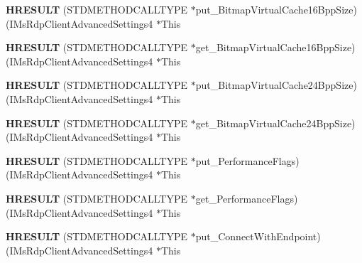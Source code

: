 \begin{DoxyCompactItemize}
{\bfseries H\+R\+E\+S\+U\+LT} (S\+T\+D\+M\+E\+T\+H\+O\+D\+C\+A\+L\+L\+T\+Y\+PE $\ast$put\+\_\+\+Bitmap\+Virtual\+Cache16\+Bpp\+Size)(I\+Ms\+Rdp\+Client\+Advanced\+Settings4 $\ast$This
\item 
\mbox{\label{struct_i_ms_rdp_client_advanced_settings4_vtbl_a248de40f77828d96f6df00f020040313}} 
{\bfseries H\+R\+E\+S\+U\+LT} (S\+T\+D\+M\+E\+T\+H\+O\+D\+C\+A\+L\+L\+T\+Y\+PE $\ast$get\+\_\+\+Bitmap\+Virtual\+Cache16\+Bpp\+Size)(I\+Ms\+Rdp\+Client\+Advanced\+Settings4 $\ast$This
\item 
\mbox{\label{struct_i_ms_rdp_client_advanced_settings4_vtbl_af2b827f8f98aefa5a0336550778a308c}} 
{\bfseries H\+R\+E\+S\+U\+LT} (S\+T\+D\+M\+E\+T\+H\+O\+D\+C\+A\+L\+L\+T\+Y\+PE $\ast$put\+\_\+\+Bitmap\+Virtual\+Cache24\+Bpp\+Size)(I\+Ms\+Rdp\+Client\+Advanced\+Settings4 $\ast$This
\item 
\mbox{\label{struct_i_ms_rdp_client_advanced_settings4_vtbl_a92e1584f3e52360b4a25576e5f82e37e}} 
{\bfseries H\+R\+E\+S\+U\+LT} (S\+T\+D\+M\+E\+T\+H\+O\+D\+C\+A\+L\+L\+T\+Y\+PE $\ast$get\+\_\+\+Bitmap\+Virtual\+Cache24\+Bpp\+Size)(I\+Ms\+Rdp\+Client\+Advanced\+Settings4 $\ast$This
\item 
\mbox{\label{struct_i_ms_rdp_client_advanced_settings4_vtbl_afe7149ea94a8261abd57088e9038222c}} 
{\bfseries H\+R\+E\+S\+U\+LT} (S\+T\+D\+M\+E\+T\+H\+O\+D\+C\+A\+L\+L\+T\+Y\+PE $\ast$put\+\_\+\+Performance\+Flags)(I\+Ms\+Rdp\+Client\+Advanced\+Settings4 $\ast$This
\item 
\mbox{\label{struct_i_ms_rdp_client_advanced_settings4_vtbl_a61c6f1840855ebda193d6731c0d7f326}} 
{\bfseries H\+R\+E\+S\+U\+LT} (S\+T\+D\+M\+E\+T\+H\+O\+D\+C\+A\+L\+L\+T\+Y\+PE $\ast$get\+\_\+\+Performance\+Flags)(I\+Ms\+Rdp\+Client\+Advanced\+Settings4 $\ast$This
\item 
\mbox{\label{struct_i_ms_rdp_client_advanced_settings4_vtbl_abda86e70b9a939cbeef56b661540d161}} 
{\bfseries H\+R\+E\+S\+U\+LT} (S\+T\+D\+M\+E\+T\+H\+O\+D\+C\+A\+L\+L\+T\+Y\+PE $\ast$put\+\_\+\+Connect\+With\+Endpoint)(I\+Ms\+Rdp\+Client\+Advanced\+Settings4 $\ast$This

\end{DoxyCompactItemize}

